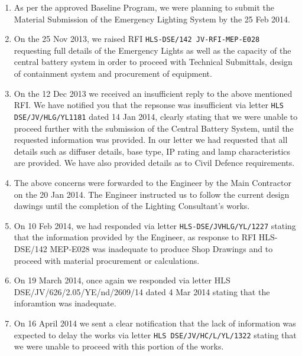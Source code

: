 \begin{enumerate}
\item As per the approved Baseline Program, we were planning to submit the Material Submission of the Emergency Lighting System by the 25 Feb 2014.
\item On the 25 Nov 2013, we raised RFI \texttt{HLS-DSE/142 JV-RFI-MEP-E028} requesting full details of the Emergency Lights as well as the capacity of the central battery system in order to proceed with Technical Submittals, design of containment system and procurement of equipment.
\item On the 12 Dec 2013 we received an insufficient reply to the above mentioned RFI. We have notified you that the repsonse was insufficient via letter \texttt{HLS DSE/JV/HLG/YL1181} dated 14 Jan 2014, clearly stating that we were unable to proceed further with the submission of the Central Battery System, until the requested information was provided. In our letter we had requested that all details such as diffuser details, base type, IP rating and lamp characteristics are provided. We have also provided details as to Civil Defence requirements.
\item The above concerns were forwarded to the Engineer by the Main Contractor on the 20 Jan 2014. The Engineer instructed us to follow the current design dawings until the completion of the Lighting Consultant’s works.

\item On 10 Feb 2014, we had responded via letter \texttt{HLS-DSE/JVHLG/YL/1227} stating that the information provided by the Engineer, as response to RFI HLS-DSE/142 MEP-E028 was inadequate to produce Shop Drawings and to proceed with material procurement or calculations.
\item On 19 March 2014, once again we responded via letter HLS DSE/JV/626/2.05/YE/nd/2609/14 dated 4 Mar 2014 stating that the inforamtion was inadequate.
\item On 16 April 2014 we sent a clear notification that the lack of information was expected to delay the works via letter \texttt{HLS DSE/JV/HC/L/YL/1322} stating that we were unable to proceed with this portion of the works.


\end{enumerate}
